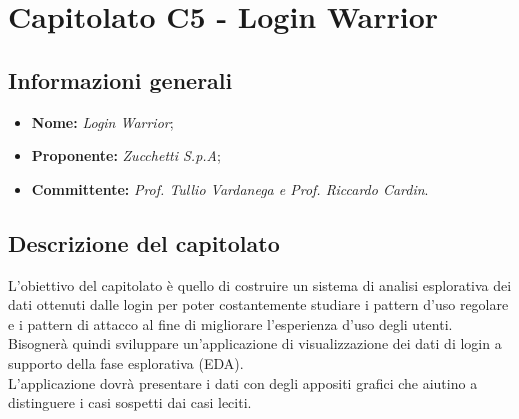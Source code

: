 \section{Capitolato C5 - Login Warrior}\label{section:c5}

\subsection{Informazioni generali}
    \begin {itemize}
        \item \textbf{Nome:} \textit{Login Warrior};
        \item \textbf{Proponente:} \textit{Zucchetti S.p.A};
        \item \textbf{Committente:} \textit{Prof. Tullio Vardanega e Prof. Riccardo Cardin}.
    \end{itemize}

\subsection{Descrizione del capitolato}
    L’obiettivo del capitolato è quello di costruire un sistema di analisi esplorativa dei dati ottenuti dalle login per poter costantemente studiare i pattern d’uso regolare e i pattern di attacco al fine di migliorare l'esperienza d'uso degli utenti.\\
    Bisognerà quindi sviluppare un’applicazione di visualizzazione dei dati di login a supporto della fase esplorativa (EDA\glo).\\
    L’applicazione dovrà presentare i dati con degli appositi grafici che aiutino a distinguere i casi sospetti dai casi leciti.

